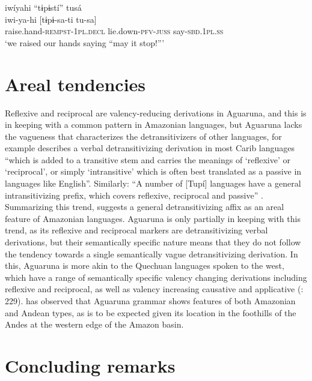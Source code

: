 \documentclass[output=paper]{langscibook}
\begin{document}
\ea%
    \label{ex:overall:37}
    \glll iwíyahi “tɨpɨstí” tusá\\
  iwi-ya-hi  [tɨpɨ-sa-ti  tu-sa]\\
  raise.hand-\textsc{rempst-1pl.decl}  lie.down-\textsc{pfv-juss}  say-\textsc{sbd.1pl.ss}\\
  \glt  ‘we raised our hands saying “may it stop!”’ \citep[350]{Overall2017}
\z

\section{Areal tendencies} %
\label{sec:overall:5}

Reflexive and reciprocal are valency-reducing derivations in Aguaruna, and this is in keeping with a common pattern in Amazonian languages, but Aguaruna lacks the vagueness that characterizes the detransitivizers of other languages, for example \citet[44]{Derbyshire1999} describes a verbal detransitivizing derivation in most Carib languages “which is added to a transitive stem and carries the meanings of ‘reflexive’ or ‘reciprocal’, or simply ‘intransitive’ which is often best translated as a passive in languages like English”. Similarly: “A number of [Tupí] languages have a general intransitivizing prefix, which covers reflexive, reciprocal and passive” \citep[120]{Rodrigues1999}. Summarizing this trend, \citet[596]{Payne2001} suggests a general detransitivizing affix as an areal feature of Amazonian languages. Aguaruna is only partially in keeping with this trend, as its reflexive and reciprocal markers are detransitivizing verbal derivations, but their semantically specific nature means that they do not follow the tendency towards a single semantically vague detransitivizing derivation. In this, Aguaruna is more akin to the Quechuan languages spoken to the west, which have a range of semantically specific valency changing derivations including reflexive and reciprocal, as well as valency increasing causative and applicative (\citealt{AdelaarMuysken2004}: 229). \citet[31-32]{Overall2017} has observed that Aguaruna grammar shows features of both Amazonian and Andean types, as is to be expected given its location in the foothills of the Andes at the western edge of the Amazon basin. 

\section{Concluding remarks} %
\label{sec:overall:6}
\end{document}
